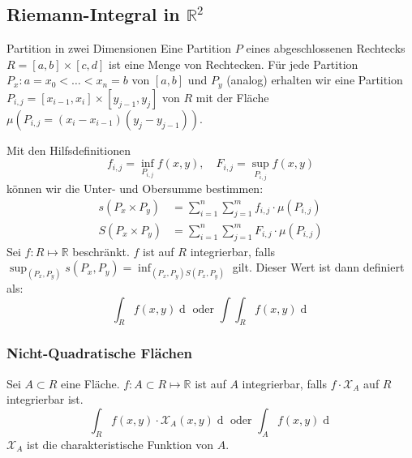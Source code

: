 \documentclass[a4paper,10pt]{article}
\def\R{\mathbb{R}}
\def\X{\mathcal{X}}
\begin{document}
\subsection{Riemann-Integral in \texorpdfstring{\(\R^2\)}{R²}}
\begin{subbox}{Partition in zwei Dimensionen}
  Eine Partition \(P\) eines abgeschlossenen Rechtecks \(R = \left[a,b\right] \times \left[c,d\right]\) ist eine Menge von Rechtecken. Für jede Partition \(P_x : a = x_0 < \ldots < x_n = b\) von \(\left[a,b\right]\) und \(P_y\) (analog) erhalten wir eine Partition \(P_{i,j} = \left[x_{i-1}, x_i\right] \times \left[y_{j-1},y_j\right]\) von \(R\) mit der Fläche \(\mu({P_{i,j}} = (x_i - x_{i-1})(y_j - y_{j-1}))\).
\end{subbox}
Mit den Hilfsdefinitionen
\[f_{i,j} = \inf_{P_{i,j}} f(x,y), \quad F_{i,j} = \sup_{P_{i,j}} f(x,y)\]
können wir die Unter- und Obersumme bestimmen:
\begin{align*}
  s(P_x \times P_y) &= \sum_{i=1}^n \sum_{j=1}^m f_{i,j} \cdot \mu(P_{i,j}) \\
  S(P_x \times P_y) &= \sum_{i=1}^n \sum_{j=1}^m F_{i,j} \cdot \mu(P_{i,j})
\end{align*}
Sei \(f: R \mapsto \R\) beschränkt. \(f\) ist auf \(R\) integrierbar, falls \(\sup_{(P_x, P_y)} s(P_x, P_y) = \inf_{(P_x, P_y) S(P_x, P_y)}\) gilt. Dieser Wert ist dann definiert als:
\[\int_R f(x,y) \mathop{d(x,y)} \text{ oder } \int\int_R f(x,y) \mathop{d(x,y)}\]

\subsubsection*{Nicht-Quadratische Flächen}
Sei \(A \subset R\) eine Fläche. \(f : A \subset R \mapsto \R\) ist auf \(A\) integrierbar, falls \(f \cdot \X_A\) auf \(R\) integrierbar ist. 
\[\int_R f(x,y) \cdot \X_A(x,y) \mathop{d(x,y)} \text{ oder } \int_A f(x,y) \mathop{d(x,y)}\]
\(\X_A\) ist die charakteristische Funktion von \(A\).
\end{document}
